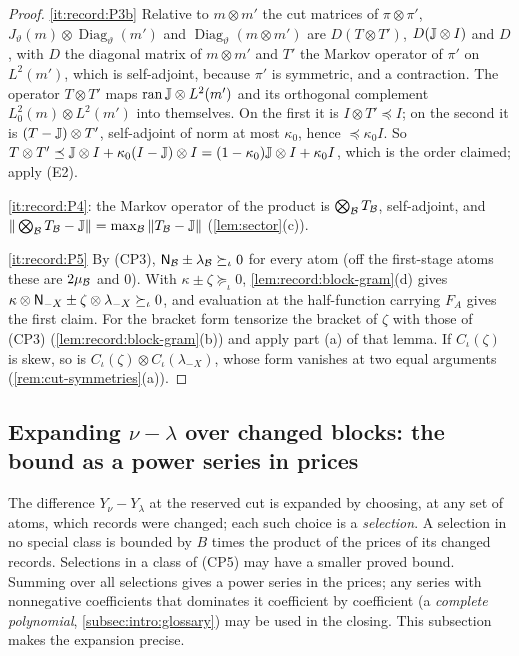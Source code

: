 \begin{proof}
\ref{it:record:P3b} Relative to $m\otimes m'$ the cut matrices of
$\pi\otimes\pi'$, $J_\vartheta(m)\otimes\operatorname{Diag}_\vartheta(m')$ and
$\operatorname{Diag}_\vartheta(m\otimes m')$ are $D(T\otimes T')$,
$D(\mathbb J\otimes I)$ and $D$, with $D$ the diagonal matrix of $m\otimes m'$
and $T'$ the Markov operator of $\pi'$ on $L^2(m')$, which is self-adjoint,
because $\pi'$ is symmetric, and a contraction. The operator $T\otimes T'$
maps $\operatorname{ran}\mathbb J\otimes L^2(m')$ and its orthogonal complement
$L^2_0(m)\otimes L^2(m')$ into themselves. On the first it is $I\otimes T'\preceq
I$; on the second it is $(T-\mathbb J)\otimes T'$, self-adjoint of norm at most
$\kappa_0$, hence $\preceq\kappa_0I$. So
$T\otimes T'\preceq\mathbb J\otimes I+\kappa_0(I-\mathbb J)\otimes I
=(1-\kappa_0)\mathbb J\otimes I+\kappa_0I$, which is the order claimed; apply
(E2).

\ref{it:record:P4}: the Markov operator of the
product is $\bigotimes_\mathcal B T_\mathcal B$, self-adjoint, and
$\|\bigotimes_\mathcal B T_\mathcal B-\mathbb J\|=\max_\mathcal B\|T_\mathcal B-\mathbb J\|$ (\cref{lem:sector}(c)).

\ref{it:record:P5} By (CP3), $\mathsf N_\mathcal B\pm\lambda_\mathcal B\succeq_\iota0$ for every
atom (off the first-stage atoms these are $2\mu_\mathcal B$ and $0$). With
$\kappa\pm\zeta\succeq_\iota0$, \cref{lem:record:block-gram}(d) gives
$\kappa\otimes\mathsf N_{-X}\pm\zeta\otimes\lambda_{-X}\succeq_\iota0$, and evaluation at
the half-function carrying $F_A$ gives the first claim. For the bracket form
tensorize the bracket of $\zeta$ with those of (CP3)
(\cref{lem:record:block-gram}(b)) and apply part (a) of that lemma. If
$C_\iota(\zeta)$ is skew, so is $C_\iota(\zeta)\otimes C_\iota(\lambda_{-X})$, whose
form vanishes at two equal arguments (\cref{rem:cut-symmetries}(a)).
\end{proof}

\subsection{Expanding \texorpdfstring{$\nu-\lambda$}{nu-lambda} over changed blocks: the bound as a power series in prices}

The difference $Y_\nu-Y_\lambda$ at the reserved cut is expanded
by choosing, at any set of atoms, which records were changed; each
such choice is a \emph{selection}. A selection in no special class
is bounded by $B$ times the product of the prices of its changed
records. Selections in a class of (CP5) may have a smaller proved
bound. Summing over all selections gives a power series in the
prices; any series with nonnegative coefficients that dominates
it coefficient by coefficient (a \emph{complete polynomial},
\cref{subsec:intro:glossary}) may be used in the closing. This
subsection makes the expansion precise.

